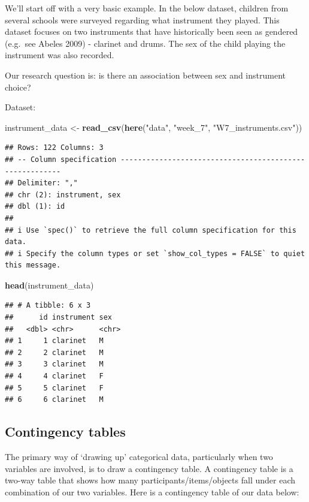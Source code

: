 \documentclass[
]{book}
\newenvironment{Shaded}{\begin{snugshade}}{\end{snugshade}}
\newcommand{\FunctionTok}[1]{\textcolor[rgb]{0.13,0.29,0.53}{\textbf{#1}}}
\newcommand{\NormalTok}[1]{#1}
\newcommand{\OtherTok}[1]{\textcolor[rgb]{0.56,0.35,0.01}{#1}}
\newcommand{\StringTok}[1]{\textcolor[rgb]{0.31,0.60,0.02}{#1}}
\begin{document}
We'll start off with a very basic example. In the below dataset, children from several schools were surveyed regarding what instrument they played. This dataset focuses on two instruments that have historically been seen as gendered (e.g.~see Abeles 2009) - clarinet and drums. The sex of the child playing the instrument was also recorded.

Our research question is: is there an association between sex and instrument choice?

Dataset:

\begin{Shaded}
\begin{Highlighting}[]
\NormalTok{instrument\_data }\OtherTok{\textless{}{-}} \FunctionTok{read\_csv}\NormalTok{(}\FunctionTok{here}\NormalTok{(}\StringTok{"data"}\NormalTok{, }\StringTok{"week\_7"}\NormalTok{, }\StringTok{"W7\_instruments.csv"}\NormalTok{))}
\end{Highlighting}
\end{Shaded}

\begin{verbatim}
## Rows: 122 Columns: 3
## -- Column specification --------------------------------------------------------
## Delimiter: ","
## chr (2): instrument, sex
## dbl (1): id
## 
## i Use `spec()` to retrieve the full column specification for this data.
## i Specify the column types or set `show_col_types = FALSE` to quiet this message.
\end{verbatim}

\begin{Shaded}
\begin{Highlighting}[]
\FunctionTok{head}\NormalTok{(instrument\_data)}
\end{Highlighting}
\end{Shaded}

\begin{verbatim}
## # A tibble: 6 x 3
##      id instrument sex  
##   <dbl> <chr>      <chr>
## 1     1 clarinet   M    
## 2     2 clarinet   M    
## 3     3 clarinet   M    
## 4     4 clarinet   F    
## 5     5 clarinet   F    
## 6     6 clarinet   M
\end{verbatim}

\subsection{Contingency tables}\label{contingency-tables}

The primary way of `drawing up' categorical data, particularly when two variables are involved, is to draw a contingency table. A contingency table is a two-way table that shows how many participants/items/objects fall under each combination of our two variables. Here is a contingency table of our data below:
\end{document}
